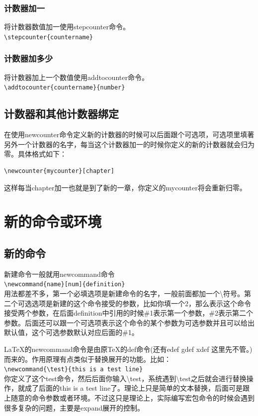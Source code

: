 \documentclass[11pt,oneside]{book}
\begin{document}
\subsection{计数器加一}
将计数器数值加一使用stepcounter命令。\\
\verb+\stepcounter{countername}+

\subsection{计数器加多少}
将计数器加上一个数值使用addtocounter命令。\\
\verb+\addtocounter{countername}{number}+

\section{计数器和其他计数器绑定}
在使用newcounter命令定义新的计数器的时候可以后面跟个可选项，可选项里填著另外一个计数器的名字，每当这个计数器加一的时候你定义的新的计数器就会归为零。具体格式如下：
\begin{Verbatim}
\newcounter{mycounter}[chapter]
\end{Verbatim}
这样每当chapter加一也就是到了新的一章，你定义的mycounter将会重新归零。





\chapter{新的命令或环境}
\section{新的命令}
新建命令一般就用newcommand命令\\
\verb+\newcommand{name}[num]{definition}+\\
用法都差不多，第一个必填选项是新建命令的名字，一般前面都加一个\textbackslash 符号。第二个可选选项是新建的这个命令接受的参数，比如你填一个2，那么表示这个命令接受两个参数，在后面definition中引用的时候\#{}1表示第一个参数，\#{}2表示第二个参数。后面还可以跟一个可选项表示这个命令的某个参数为可选参数并且可以给出默认值，这个可选参数默认对应后面的\#{}1。

\LaTeX 的newcommand命令是由原\TeX 的def命令(还有edef gdef xdef 这里先不管。)而来的。作用原理有点类似于替换展开的功能。比如：\\
\verb+\newcommand{\test}{this is a test line}+\\
你定义了这个test命令，然后后面你输入\textbackslash test，系统遇到\textbackslash test之后就会进行替换操作，就成了后面的this is a test line了。理论上只是简单的文本替换，后面可是跟上随意的命令参数或者环境。不过这只是理论上，实际编写宏包命令的时候会遇到很多复杂的问题，主要是expand展开的控制。
\end{document}
